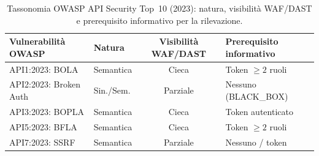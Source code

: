 \begin{table}[ht]
  \centering \small
  \begin{tabularx}{\textwidth}{@{} l l C L @{}}
    \toprule
    \textbf{Vulnerabilità OWASP} & \textbf{Natura} & \textbf{Visibilità WAF/DAST} & \textbf{Prerequisito informativo} \\
    \midrule
    API1:2023: BOLA              & Semantica       & Cieca                        & Token $\geq 2$ ruoli              \\
    \addlinespace
    API2:2023: Broken Auth       & Sin./Sem.       & Parziale                     & Nessuno (BLACK\_BOX)              \\
    \addlinespace
    API3:2023: BOPLA             & Semantica       & Cieca                        & Token autenticato                 \\
    \addlinespace
    API5:2023: BFLA              & Semantica       & Cieca                        & Token $\geq 2$ ruoli              \\
    \addlinespace
    API7:2023: SSRF              & Semantica       & Parziale                     & Nessuno / token                   \\
    \bottomrule
  \end{tabularx}
  \caption{Tassonomia OWASP API Security Top~10 (2023): natura, visibilità WAF/DAST e prerequisito informativo per la rilevazione.}
  \label{tab:semantic-gap}
\end{table}